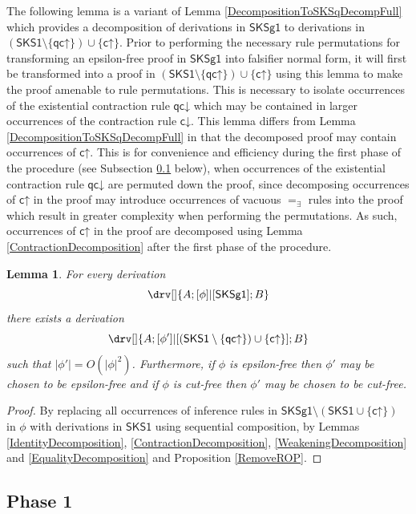 \documentclass[10pt]{article}
\newtheorem{lemma}[theorem]{Lemma}
\theoremstyle{definition}\newtheorem{remark}[theorem]{Remark}
\theoremstyle{definition}\newtheorem{example}[theorem]{Example}
\theoremstyle{definition}\newtheorem{definition}[theorem]{Definition}
\newcommand{\SKSq}{{\mathsf{SKSg1}}}
\newcommand{\SKSqDecomp}{{\mathsf{SKS1}}}
\newcommand{\cUp}{{\mathsf{c\mathord\uparrow}}}
\newcommand{\cDown}{{\mathsf{c\mathord\downarrow}}}
\newcommand{\qcUp}{{\mathsf{qc\mathord\uparrow}}}
\newcommand{\qcDown}{{\mathsf{qc\mathord\downarrow}}}
\newcommand{\eqExists}{=_{\exists}}
\begin{document}
	The following lemma is a variant of Lemma \ref{DecompositionToSKSqDecompFull} which provides a decomposition of derivations in $\SKSq$ to derivations in $(\SKSqDecomp \setminus \{\qcUp\}) \cup \{\cUp\}$. Prior to performing the necessary rule permutations for transforming an epsilon-free proof in $\SKSq$ into falsifier normal form, it will first be transformed into a proof in $(\SKSqDecomp \setminus \{\qcUp\}) \cup \{\cUp\}$ using this lemma to make the proof amenable to rule permutations. This is necessary to isolate occurrences of the existential contraction rule $\qcDown$ which may be contained in larger occurrences of the contraction rule $\cDown$. This lemma differs from Lemma \ref{DecompositionToSKSqDecompFull} in that the decomposed proof may contain occurrences of $\cUp$. This is for convenience and efficiency during the first phase of the procedure (see Subsection \ref{Phase1Section} below), when occurrences of the existential contraction rule $\qcDown$ are permuted down the proof, since decomposing occurrences of $\cUp$ in the proof may introduce occurrences of vacuous $\eqExists$ rules into the proof which result in greater complexity when performing the permutations. As such, occurrences of $\cUp$ in the proof are decomposed using Lemma \ref{ContractionDecomposition} after the first phase of the procedure.
	
	\begin{lemma}\label{DecompositionToSKSqDecomp}
		For every derivation
		\[
			\drv[] {
				A ; [\phi]|[\SKSq] ; B
			}
		\]
		there exists a derivation
		\[
			\drv[] {
				A ; [\phi']|[(\SKSqDecomp \setminus \{\qcUp\}) \cup \{\cUp\}] ; B
			}
		\]
		such that $| \phi' | = O(| \phi |^2)$. Furthermore, if $\phi$ is epsilon-free then $\phi'$ may be chosen to be epsilon-free and if $\phi$ is cut-free then $\phi'$ may be chosen to be cut-free.
	\end{lemma}
	
	\begin{proof}
		By replacing all occurrences of inference rules in $\SKSq \setminus (\SKSqDecomp \cup \{\cUp\})$ in $\phi$ with derivations in $\SKSqDecomp$ using sequential composition, by Lemmas \ref{IdentityDecomposition}, \ref{ContractionDecomposition}, \ref{WeakeningDecomposition} and \ref{EqualityDecomposition} and Proposition \ref{RemoveROP}.
	\end{proof}

	\subsection{Phase 1}\label{Phase1Section}
	
\end{document}
